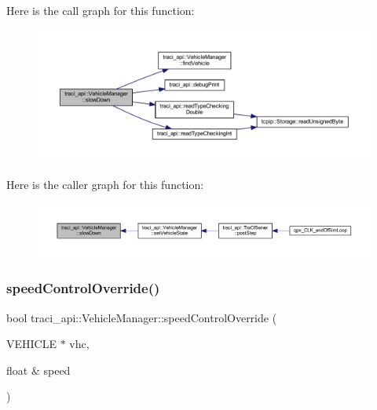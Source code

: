 Here is the call graph for this function\+:\nopagebreak
\begin{figure}[H]
\begin{center}
\leavevmode
\includegraphics[width=350pt]{classtraci__api_1_1_vehicle_manager_afaa8625978e32aab7ca85cd52ce450a8_cgraph}
\end{center}
\end{figure}
Here is the caller graph for this function\+:\nopagebreak
\begin{figure}[H]
\begin{center}
\leavevmode
\includegraphics[width=350pt]{classtraci__api_1_1_vehicle_manager_afaa8625978e32aab7ca85cd52ce450a8_icgraph}
\end{center}
\end{figure}
\mbox{\label{classtraci__api_1_1_vehicle_manager_acebd30eec75b857573c9237d9a15244f}} 
\subsubsection{\texorpdfstring{speed\+Control\+Override()}{speedControlOverride()}}
{\footnotesize\ttfamily bool traci\+\_\+api\+::\+Vehicle\+Manager\+::speed\+Control\+Override (\begin{DoxyParamCaption}\item[{V\+E\+H\+I\+C\+LE $\ast$}]{vhc,  }\item[{float \&}]{speed }\end{DoxyParamCaption})}



